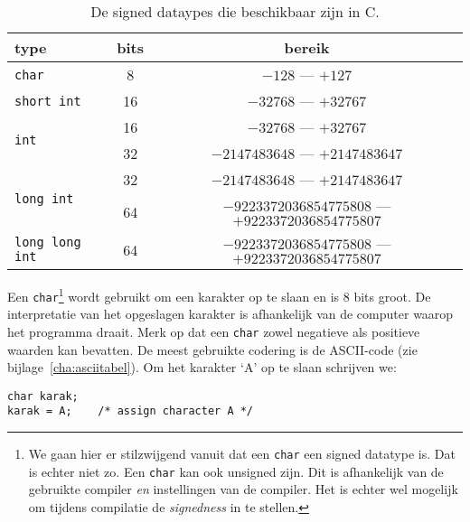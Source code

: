 \begin{table}[!ht]
\centering
\caption{De signed dataypes die beschikbaar zijn in C.}
\label{tab:varintdatatypes}
\begin{tabular}{@{}lcc@{}}
\toprule
\textbf{type}                         & \textbf{bits} & \textbf{bereik}  \\ \midrule
\texttt{char}                         & 8                       & $-128$ --- $+127$  \\
\texttt{short int}                    & 16                      & $-32768$ --- $+32767$ \\
\multirow{2}{*}{\texttt{int}}         & 16                      & $-32768$ --- $+32767$ \\
                                      & 32                      & $-2147483648$ --- $+2147483647$ \\
\multirow{2}{*}{\texttt{long int}}    & 32                      & $-2147483648$ --- $+2147483647$ \\
                                      & 64                      & $-9223372036854775808$ --- $+9223372036854775807$  \\
\texttt{long long int}                & 64                      & $-9223372036854775808$ --- $+9223372036854775807$  \\
   \bottomrule
\end{tabular}
\end{table}

Een \texttt{char}\footnote{We gaan hier er stilzwijgend vanuit dat een \texttt{char} een signed datatype is. Dat is echter niet zo. Een \texttt{char} kan ook unsigned zijn. Dit is afhankelijk van de gebruikte compiler \textsl{en} instellingen van de compiler. Het is echter wel mogelijk om tijdens compilatie de \textsl{signedness} in te stellen.} wordt gebruikt om een karakter op te slaan en is 8 bits groot. De interpretatie van het opgeslagen karakter is afhankelijk van de computer waarop het programma draait. Merk op dat een \texttt{char} zowel negatieve als positieve waarden kan bevatten. De meest gebruikte codering is de ASCII-code (zie bijlage~\ref{cha:asciitabel}). Om het karakter `A' op te slaan schrijven we:

\hspace*{1em}\texttt{char karak;}\\
\hspace*{1em}\texttt{karak = \textquotesingle A\textquotesingle; \ \ \ /* assign character A */}

